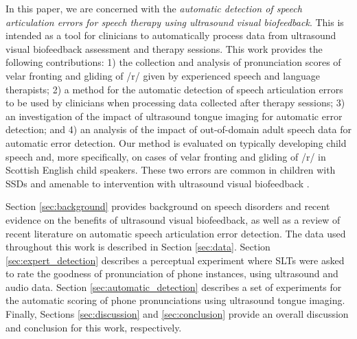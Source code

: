 In this paper, we are concerned with the \emph{automatic detection of speech articulation errors for speech therapy using ultrasound visual biofeedback}.
This is intended as a tool for clinicians to automatically process data from ultrasound visual biofeedback assessment and therapy sessions.
This work provides the following contributions:
1) the collection and analysis of pronunciation scores of velar fronting and gliding of /r/ given by experienced speech and language therapists;
2) a method for the automatic detection of speech articulation errors to be used by clinicians when processing data collected after therapy sessions;
3) an investigation of the impact of ultrasound tongue imaging for automatic error detection; and
4) an analysis of the impact of out-of-domain adult speech data for automatic error detection.
Our method is evaluated on typically developing child speech and, more specifically, on cases of velar fronting and gliding of /r/ in Scottish English child speakers.
These two errors are common in children with SSDs and amenable to intervention with ultrasound visual biofeedback \citep{sugden2019systematic}.

Section \ref{sec:background} provides background on speech disorders and recent evidence on the benefits of ultrasound visual biofeedback, as well as a review of recent literature on automatic speech articulation error detection.
The data used throughout this work is described in Section \ref{sec:data}.
Section \ref{sec:expert_detection} describes a perceptual experiment where SLTs were asked to rate the goodness of pronunciation of phone instances, using ultrasound and audio data.
Section \ref{sec:automatic_detection} describes a set of experiments for the automatic scoring of phone pronunciations using ultrasound tongue imaging.
Finally, Sections \ref{sec:discussion} and \ref{sec:conclusion} provide an overall discussion and conclusion for this work, respectively.
